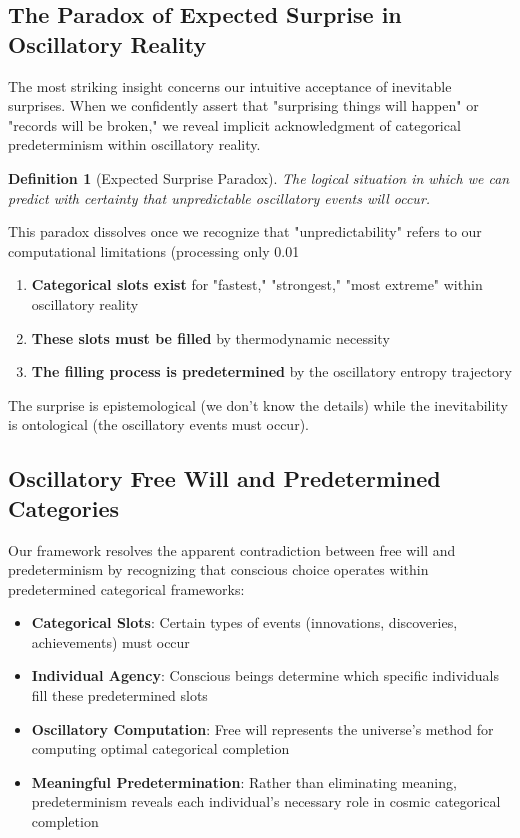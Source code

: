 \documentclass[11pt]{article}
\newtheorem{definition}[theorem]{Definition}
\theoremstyle{remark}
\begin{document}
\subsection{The Paradox of Expected Surprise in Oscillatory Reality}

The most striking insight concerns our intuitive acceptance of inevitable surprises. When we confidently assert that "surprising things will happen" or "records will be broken," we reveal implicit acknowledgment of categorical predeterminism within oscillatory reality.

\begin{definition}[Expected Surprise Paradox]
The logical situation in which we can predict with certainty that unpredictable oscillatory events will occur.
\end{definition}

This paradox dissolves once we recognize that "unpredictability" refers to our computational limitations (processing only 0.01%

\begin{enumerate}
\item \textbf{Categorical slots exist} for "fastest," "strongest," "most extreme" within oscillatory reality
\item \textbf{These slots must be filled} by thermodynamic necessity
\item \textbf{The filling process is predetermined} by the oscillatory entropy trajectory
\end{enumerate}

The surprise is epistemological (we don't know the details) while the inevitability is ontological (the oscillatory events must occur).

\subsection{Oscillatory Free Will and Predetermined Categories}

Our framework resolves the apparent contradiction between free will and predeterminism by recognizing that conscious choice operates within predetermined categorical frameworks:

\begin{itemize}
\item \textbf{Categorical Slots}: Certain types of events (innovations, discoveries, achievements) must occur
\item \textbf{Individual Agency}: Conscious beings determine which specific individuals fill these predetermined slots
\item \textbf{Oscillatory Computation}: Free will represents the universe's method for computing optimal categorical completion
\item \textbf{Meaningful Predetermination}: Rather than eliminating meaning, predeterminism reveals each individual's necessary role in cosmic categorical completion
\end{itemize}
\end{document}
